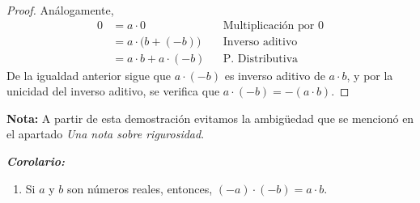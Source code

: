 \documentclass[11pt]{article}
\begin{document}
\begin{enumerate}[label=\alph*)]
\begin{proof}
        Análogamente,
        \begin{align*}
            0 &= a\cdot 0 && \text{Multiplicación por $0$}\\
            &= a \cdot \bigl(b+(-b)\bigr) && \text{Inverso aditivo}\\
            &= a\cdot b + a\cdot (-b) && \text{P. Distributiva}
        \end{align*} De la igualdad anterior sigue que $a\cdot (-b)$ es inverso aditivo de $a\cdot b$, y por la unicidad del inverso aditivo, se verifica que $a\cdot (-b) = -(a\cdot b)$.   
    \end{proof} \vspace{-1em}
    \textbf{Nota:} A partir de esta demostración evitamos la ambigüedad que se mencionó en el apartado \textit{Una nota sobre rigurosidad}.

    \textbf{\textit{Corolario:}}
    \begin{enumerate}[label=\roman*)]
        \item Si $a$ y $b$ son números reales, entonces, $ (-a) \cdot (-b) = a \cdot b $.%
    

\end{enumerate}
\end{enumerate}
\end{document}

